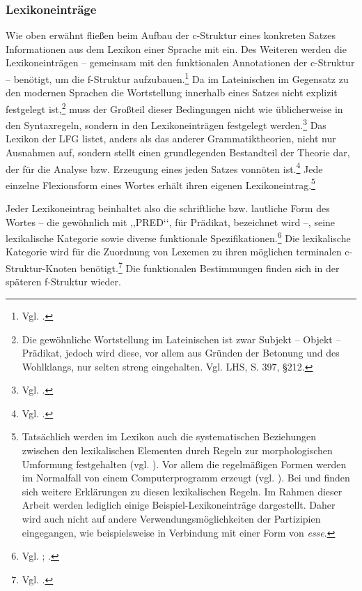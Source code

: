\documentclass[12pt,a4paper]{article}
\begin{document}
\subsubsection{Lexikoneinträge}
Wie oben erwähnt fließen beim Aufbau der c-Struktur eines konkreten Satzes Informationen aus dem Lexikon einer Sprache mit ein. Des Weiteren werden die Lexikoneinträgen -- gemeinsam mit den funktionalen Annotationen der c-Struktur  -- benötigt, um die f-Struktur aufzubauen.\footnote{Vgl. \cite[63]{Skript}.} Da im Lateinischen im Gegensatz zu den modernen Sprachen die Wortstellung innerhalb eines Satzes nicht explizit festgelegt ist,\footnote{Die gewöhnliche Wortstellung im Lateinischen ist zwar Subjekt – Objekt – Prädikat, jedoch wird diese, vor allem aus Gründen der Betonung und des Wohlklangs, nur selten streng eingehalten. Vgl. LHS, S. 397, §212.} muss der Großteil dieser Bedingungen nicht wie üblicherweise in den Syntaxregeln, sondern in den Lexikoneinträgen festgelegt werden.\footnote{Vgl. \cite[6]{Bresnan}.} Das Lexikon der LFG listet, anders als das anderer Grammatiktheorien, nicht nur Ausnahmen auf, sondern stellt einen grundlegenden Bestandteil der Theorie dar, der für die Analyse bzw. Erzeugung eines jeden Satzes vonnöten ist.\footnote{Vgl. \cite[3]{Dal}.} Jede einzelne Flexionsform eines Wortes erhält ihren eigenen Lexikoneintrag.\footnote{Tatsächlich werden im Lexikon auch die systematischen Beziehungen zwischen den lexikalischen Elementen durch Regeln zur morphologischen Umformung festgehalten (vgl. \cite[3]{Dal}). Vor allem die regelmäßigen Formen werden im Normalfall von einem Computerprogramm erzeugt (vgl. \cite[15]{Rohrer}). Bei \cite[63-76]{Skript} und \cite[20-21]{Rohrer} finden sich weitere Erklärungen zu diesen lexikalischen Regeln. Im Rahmen dieser Arbeit werden lediglich einige Beispiel-Lexikoneinträge dargestellt. Daher wird auch nicht auf andere Verwendungsmöglichkeiten der Partizipien eingegangen, wie beispielsweise in Verbindung mit einer Form von \textit{esse}.}





Jeder Lexikoneintrag beinhaltet also die schriftliche bzw. lautliche Form des Wortes -- die gewöhnlich mit ,,PRED‘‘, für Prädikat, bezeichnet wird --, seine lexikalische Kategorie sowie diverse funktionale Spezifikationen.\footnote{Vgl. \cite[27; 33]{Rohrer}; \cite[16]{Skript}.} Die lexikalische Kategorie wird für die Zuordnung von Lexemen zu ihren möglichen terminalen c-Struktur-Knoten benötigt.\footnote{Vgl. \cite[63]{Skript}.} Die funktionalen Bestimmungen finden sich in der späteren f-Struktur wieder.
\end{document}
